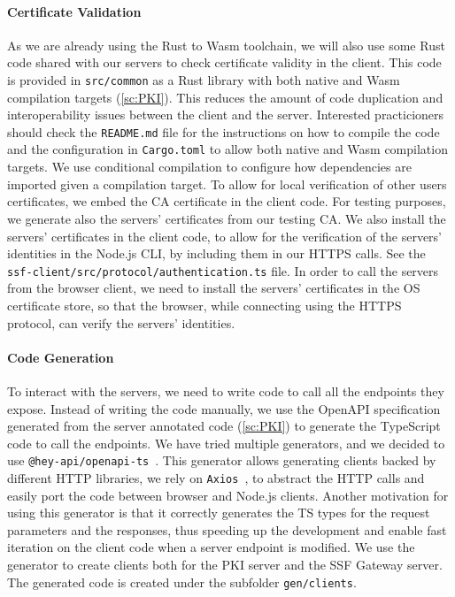 \paragraph{Certificate Validation}
As we are already using the Rust to Wasm toolchain, 
we will also use some Rust code shared
with our servers to check certificate validity in the client.
This code is provided in \texttt{src/common} as a Rust library
with both native and Wasm compilation targets (\cref{sc:PKI}).
This reduces the amount of code duplication and interoperability
issues between the client and the server. Interested practicioners
should check the \texttt{README.md} file for the
instructions on how to compile the code and the configuration
in \texttt{Cargo.toml} to allow both native and Wasm compilation
targets. We use conditional
compilation to configure how dependencies are imported
given a compilation target. To allow for local verification
of other users certificates,
we embed the CA certificate in the client code.
For testing purposes, we generate also the servers' certificates
from our testing CA.
We also install the servers' certificates in the client code,
to allow for the verification of the servers' identities
in the Node.js CLI, by including them in our HTTPS calls.
See the \texttt{ssf-client/src/protocol/authentication.ts} file.
In order to call the servers from the browser client,
we need to install the servers' certificates in the OS
certificate store, so that the browser, while connecting 
using the HTTPS protocol, can verify the servers' identities.

\paragraph{Code Generation}
To interact with the servers, we need to write code to
call all the endpoints they expose.
Instead of writing the code manually, we use the OpenAPI
specification generated from the server annotated code (\cref{sc:PKI})
to generate the TypeScript code to call the endpoints.
We have tried multiple generators, and we
decided to use \texttt{@hey-api/openapi-ts}~\cite{OpenAPITs}.
This generator allows generating clients backed by
different HTTP libraries, we rely on \texttt{Axios}~\cite{OpenAPIAxios}, 
to abstract the HTTP calls and easily port the code
between browser and Node.js clients.
Another motivation for using this generator is that it
correctly generates the TS types for the request parameters
and the responses, thus speeding up the development
and enable fast iteration on the client code when a server
endpoint is modified.
We use the generator to create clients both for the PKI server and the SSF Gateway server.
The generated code is created under the subfolder \texttt{gen/clients}.


